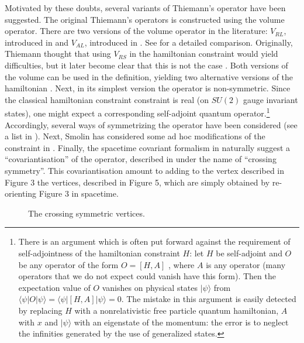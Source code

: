 \begin{description}
Motivated by these doubts, several variants of Thiemann's 
operator have been suggested.  The original Thiemann's operators 
is constructed using the volume operator.  There are two versions 
of the volume operator in the literature: $V_{RL}$, introduced in 
\cite{RovelliSmolin95} and $V_{AL}$, introduced in 
\cite{AshtekarLewandowski,AshtekarLewandowski2,%
AshtekarLewandowski3}.  See 
\cite{Lewandowski97} for a detailed comparison.  Originally, 
Thiemann thought that using $V_{RS}$ in the hamiltonian 
constraint would yield difficulties, but it later become clear 
that this is not the case \cite{LewandowskiMarolf}.  Both 
versions of the volume can be used in the definition, yielding 
two alternative versions of the hamiltonian 
\cite{LewandowskiMarolf}.  Next, in its simplest version the 
operator is non-symmetric.  Since the classical hamiltonian 
constraint constraint is real (on $SU(2)$ gauge invariant 
states), one might expect a corresponding self-adjoint quantum 
operator.\footnote{There is an argument which is often put 
forward against the requirement of self-adjointness of the 
hamiltonian constraint $H$: let $H$ be self-adjoint and $O$ be 
any operator of the form $O=[H,A]$ , where $A$ is any operator 
(many operators that we do not expect could vanish have this 
form).  Then the expectation value of $O$ vanishes on physical 
states $|\psi\rangle$ from 
$\langle\psi|O|\psi\rangle=\langle\psi|[H,A]|\psi\rangle=0$.  The 
mistake in this argument is easily detected by replacing $H$ with 
a nonrelativistic free particle quantum hamiltonian, $A$ with $x$ 
and $|\psi\rangle$ with an eigenstate of the momentum: the error 
is to neglect the infinities generated by the use of generalized 
states.} Accordingly, several ways of symmetrizing the operator 
have been considered (see a list in \cite{LewandowskiMarolf}).  
Next, Smolin has considered some ad hoc modifications of the 
constraint in \cite{Smolin96}.  Finally, the spacetime covariant 
formalism in \cite{ReisenbergerRovelli} naturally suggest a 
``covariantisation'' of the operator, described in 
\cite{ReisenbergerRovelli} under the name of ``crossing 
symmetry''.  This covariantisation amount to adding to the vertex 
described in Figure 3 the vertices, described in Figure 5, which 
are simply obtained by re-orienting Figure 3 in spacetime.
 \begin{figure}
 \centerline{\mbox{} \hskip1cm 
 \mbox{}}
 \caption{The crossing symmetric vertices.}
 \end{figure}


\end{description}
